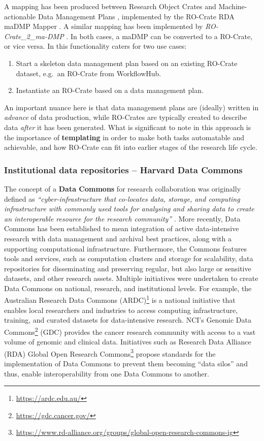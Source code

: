 A mapping has been produced between Research Object Crates and
Machine-actionable Data Management Plans
\cite{ch5-87}, implemented by
the RO-Crate RDA maDMP Mapper
\cite{ch5-7}. A similar
mapping has been implemented by \emph{RO-Crate\_2\_ma-DMP}
\cite{Brenner 2020}. In both cases,
a maDMP can be converted to a RO-Crate, or vice versa. In
\cite{ch5-87} this
functionality caters for two use cases:

\begin{enumerate}
\item
  Start a skeleton data management plan based on an existing RO-Crate
  dataset, e.g.~an RO-Crate from WorkflowHub.
\item
  Instantiate an RO-Crate based on a data management plan.
\end{enumerate}

An important nuance here is that data management plans are (ideally)
written in \emph{advance} of data production, while RO-Crates are
typically created to describe data \emph{after} it has been generated.
What is significant to note in this approach is the importance of
\textbf{templating} in order to make both tasks automatable and
achievable, and how RO-Crate can fit into earlier stages of the research
life cycle.

\subsubsection{Institutional data repositories -- Harvard Data Commons}
\label{ch5:institutionalrepos}

The concept of a \textbf{Data Commons} for research collaboration was
originally defined as \emph{``cyber-infrastructure that co-locates data,
storage, and computing infrastructure with commonly used tools for
analysing and sharing data to create an interoperable resource for the
research community''}
\cite{ch5-59}. More recently,
Data Commons has been established to mean integration of active
data-intensive research with data management and archival best
practices, along with a supporting computational infrastructure.
Furthermore, the Commons features tools and services, such as
computation clusters and storage for scalability, data repositories for
disseminating and preserving regular, but also large or sensitive
datasets, and other research assets. Multiple initiatives were
undertaken to create Data Commons on national, research, and
institutional levels. For example, the Australian Research Data Commons
(ARDC)\footnote{\url{https://ardc.edu.au/}} 
\cite{Barker 2019} is a national
initiative that enables local researchers and industries to access
computing infrastructure, training, and curated datasets for
data-intensive research. NCI's Genomic
Data Commons\footnote{\url{https://gdc.cancer.gov/}} (GDC)
\cite{ch5-65} provides
the cancer research community with access to a vast volume of genomic
and clinical data. Initiatives such as
Research Data Alliance (RDA) Global Open Research Commons\footnote{\url{https://www.rd-alliance.org/groups/global-open-research-commons-ig}}
propose standards for
the implementation of Data Commons to prevent them becoming ``data
silos'' and thus, enable interoperability from one Data Commons to
another.

